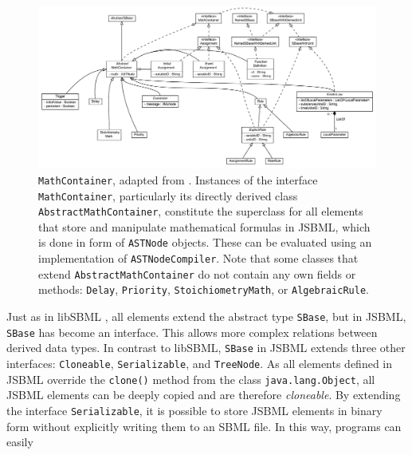 \documentclass[
  BCOR12mm,
  letterpaper,
  11pt,
  headsepline,
  pointlessnumbers,
  tablecaptionabove,
  onelinecaption,
  headinclude,
  appendixprefix,
  idxtotoc,
  bibtotoc,
  twoside,
  titlepage
]{scrartcl}
\begin{document}
\begin{figure}[htb]
 \centering
 \includegraphics[width=\textwidth]{img/MathContainer}
 \caption[\texttt{MathContainer}]{\texttt{MathContainer}, adapted from
 \citep{Draeger2011}. Instances of the interface \texttt{MathContainer},
 particularly its directly derived class \texttt{AbstractMathContainer},
 constitute the superclass for all elements that store and manipulate
 mathematical formulas in JSBML, which is done in form of \texttt{ASTNode}
 objects. These can be evaluated using an implementation of
 \texttt{ASTNodeCompiler}. Note that some classes that extend
 \texttt{AbstractMathContainer} do not contain any own fields or methods:
 \texttt{Delay}, \texttt{Priority}, \texttt{StoichiometryMath}, or
 \texttt{AlgebraicRule}.}
 \label{fig:MathContainerHierarchy}
\end{figure}
Just as in libSBML \citep{Bornstein2008}, all elements extend the abstract type \texttt{SBase}, but in
JSBML, \texttt{SBase} has become an interface. This allows more complex relations
between derived data types. In contrast to libSBML, \texttt{SBase} in JSBML
extends three other interfaces: \texttt{Cloneable}, \texttt{Serializable},
and \texttt{TreeNode}. As all elements defined in JSBML override the \texttt{clone()}
method from the class \texttt{java.lang.Object}, all JSBML elements can be deeply
copied and are therefore \emph{cloneable}. By extending the interface
\texttt{Serializable},
it is possible to store JSBML elements in binary form
without explicitly writing them to an SBML file. In this way, programs can easily
\end{document}
